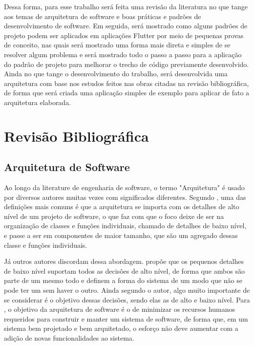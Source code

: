 \documentclass[12pt, %
openright, 
oneside, %
a4paper,    %
brazil]{facom-ufu-abntex2}
\begin{document}
Dessa forma, para esse trabalho será feita uma revisão da literatura no que tange aos temas de arquitetura de software e boas práticas e padrões de desenvolvimento de software. Em seguida, será mostrado como alguns padrões de projeto podem ser aplicados em aplicações Flutter por meio de pequenas provas de conceito, nas quais será mostrado uma forma mais direta e simples de se resolver algum problema e será mostrado todo o passo a passo para a aplicação do padrão de projeto para melhorar o trecho de código previamente desenvolvido. Ainda no que tange o desenvolvimento do trabalho, será desenvolvida uma arquitetura com base nos estudos feitos nas obras citadas na revisão bibliográfica, de forma que será criada uma aplicação simples de exemplo para aplicar de fato a arquitetura elaborada.

\chapter{Revisão Bibliográfica}

\section{Arquitetura de Software}
Ao longo da literature de engenharia de software, o termo "Arquitetura" é usado por diversos autores muitas vezes com significados diferentes. Segundo , uma das definições mais comuns é que a arquitetura se importa com os detalhes de alto nível de um projeto de software, o que faz com que o foco deixe de ser na organização de classes e funções individuais, chamado de detalhes de baixo nível, e passe a ser em componentes de maior tamanho, que são um agregado dessas classe e funções individuais.

Já outros autores discordam dessa abordagem.  propõe que os pequenos detalhes de baixo nível suportam todos as decisões de alto nível, de forma que ambos são parte de um mesmo todo e definem a forma do sistema de um modo que não se pode ter um sem haver o outro. Ainda segundo o autor, algo muito importante de se considerar é o objetivo dessas decisões, sendo elas as de alto e baixo nível. Para , o objetivo da arquitetura de software é o de minimizar os recursos humanos requeridos para construir e manter um sistema de software, de forma que, em um sistema bem projetado e bem arquitetado, o esforço não deve aumentar com a adição de novas funcionalidades ao sistema.
\end{document}
